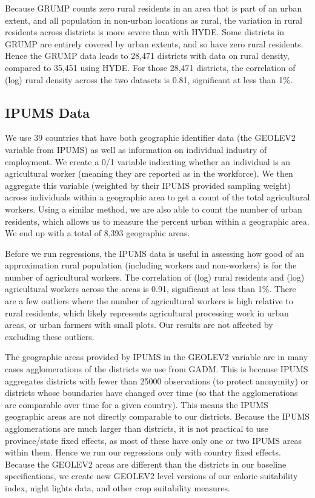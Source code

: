 \documentclass[11pt]{article}
\begin{document}
Because GRUMP counts zero rural residents in an area that is part of an urban extent, and all population in non-urban locations as rural, the variation in rural residents across districts is more severe than with HYDE. Some districts in GRUMP are entirely covered by urban extents, and so have zero rural residents. Hence the GRUMP data leads to 28,471 districts with data on rural density, compared to 35,451 using HYDE. For those 28,471 districts, the correlation of (log) rural density across the two datasets is 0.81, significant at less than 1\%. 

\subsection{IPUMS Data}
We use 39 countries that have both geographic identifier data (the GEOLEV2 variable from IPUMS) as well as information on individual industry of employment. We create a 0/1 variable indicating whether an individual is an agricultural worker (meaning they are reported as in the workforce). We then aggregate this variable (weighted by their IPUMS provided sampling weight) across individuals within a geographic area to get a count of the total agricultural workers. Using a similar method, we are also able to count the number of urban residents, which allows us to measure the percent urban within a geographic area. We end up with a total of 8,393 geographic areas.

Before we run regressions, the IPUMS data is useful in assessing how good of an approximation rural population (including workers and non-workers) is for the number of agricultural workers. The correlation of (log) rural residents and (log) agricultural workers across the areas is 0.91, significant at less than 1\%. There are a few outliers where the number of agricultural workers is high relative to rural residents, which likely represents agricultural processing work in urban areas, or urban farmers with small plots. Our results are not affected by excluding these outliers.

The geographic areas provided by IPUMS in the GEOLEV2 variable are in many cases agglomerations of the districts we use from GADM. This is because IPUMS aggregates districts with fewer than 25000 observations (to protect anonymity) or districts whose boundaries have changed over time (so that the agglomerations are comparable over time for a given country). This means the IPUMS geographic areas are not directly comparable to our districts. Because the IPUMS agglomerations are much larger than districts, it is not practical to use province/state fixed effects, as most of these have only one or two IPUMS areas within them. Hence we run our regressions only with country fixed effects. Because the GEOLEV2 areas are different than the districts in our baseline specifications, we create new GEOLEV2 level versions of our caloric suitability index, night lights data, and other crop suitability measures. 
\end{document}
